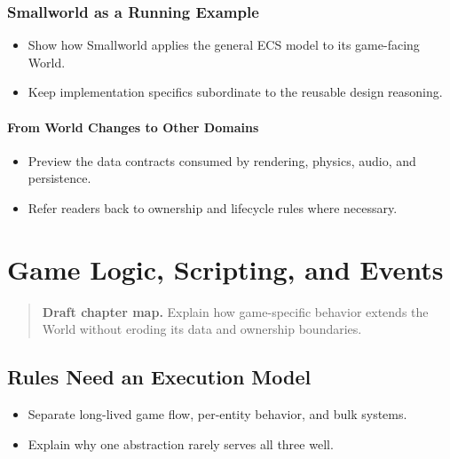 \documentclass[
  11pt,
  letterpaper,
  DIV=11,
  numbers=noendperiod,
  twoside,
  open=right]{scrreprt}
\providecommand{\tightlist}{%
  \setlength{\itemsep}{0pt}\setlength{\parskip}{0pt}}
\begin{document}
\subsection{Smallworld as a Running
Example}\label{smallworld-as-a-running-example}

\begin{itemize}
\tightlist
\item
  Show how Smallworld applies the general ECS model to its game-facing
  World.
\item
  Keep implementation specifics subordinate to the reusable design
  reasoning.
\end{itemize}

\subsubsection{From World Changes to Other
Domains}\label{from-world-changes-to-other-domains}

\begin{itemize}
\tightlist
\item
  Preview the data contracts consumed by rendering, physics, audio, and
  persistence.
\item
  Refer readers back to ownership and lifecycle rules where necessary.
\end{itemize}

\chapter{Game Logic, Scripting, and
Events}\label{game-logic-scripting-and-events}

\begin{quote}
\textbf{Draft chapter map.} Explain how game-specific behavior extends
the World without eroding its data and ownership boundaries.
\end{quote}

\section{Rules Need an Execution
Model}\label{rules-need-an-execution-model}

\begin{itemize}
\tightlist
\item
  Separate long-lived game flow, per-entity behavior, and bulk systems.
\item
  Explain why one abstraction rarely serves all three well.
\end{itemize}
\end{document}
